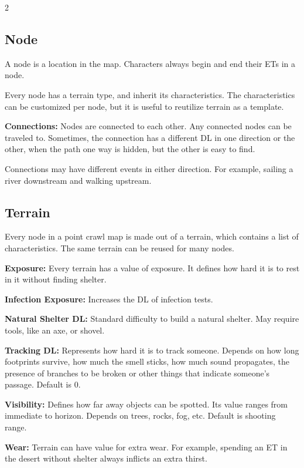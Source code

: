 \begin{multicols}{2}
\subsection{Node}

A node is a location in the map. Characters always begin and end their ETs in a node.

Every node has a terrain type, and inherit its characteristics. The characteristics can be customized per node, but it is useful to reutilize terrain as a template.

\textbf{Connections:} Nodes are connected to each other. Any connected nodes can be traveled to. Sometimes, the connection has a different DL in one direction or the other, when the path one way is hidden, but the other is easy to find. 

Connections may have different events in either direction. For example, sailing a river downstream and walking upstream. 

\subsection{Terrain}

Every node in a point crawl map is made out of a terrain, which contains a list of characteristics. The same terrain can be reused for many nodes.

\textbf{Exposure:} Every terrain has a value of exposure. It defines how hard it is to rest in it without finding shelter.

\textbf{Infection Exposure:} Increases the DL of infection tests. 

\textbf{Natural Shelter DL:} Standard difficulty to build a natural shelter. May require tools, like an axe, or shovel.

\textbf{Tracking DL:} Represents how hard it is to track someone. Depends on how long footprints survive, how much the smell sticks, how much sound propagates, the presence of branches to be broken or other things that indicate someone's passage. Default is 0.

\textbf{Visibility:} Defines how far away objects can be spotted. Its value ranges from immediate to horizon. Depends on trees, rocks, fog, etc. Default is shooting range.

\textbf{Wear:} Terrain can have value for extra wear. For example, spending an ET in the desert without shelter always inflicts an extra thirst.


\end{multicols}
